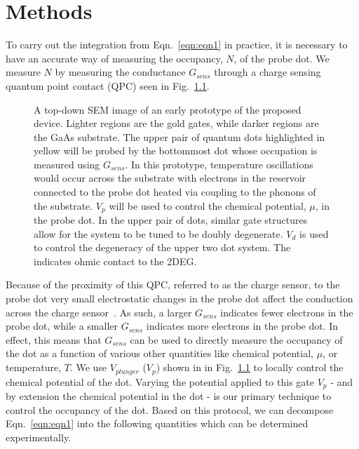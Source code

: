 
\chapter{Methods}
\label{ch:Methods}

To carry out the integration from Eqn.~\ref{eqn:eqn1} in practice, it is necessary to have an accurate way of measuring the occupancy, $N$, of the probe dot. We measure $N$ by measuring the conductance $G_{sens}$ through a charge sensing quantum point contact (QPC) seen in Fig.~\ref{fig:device}. 
\begin{figure}[h]
\centering
{}
\caption{ A top-down SEM image of an early prototype of the proposed device. Lighter regions are the gold gates, while darker regions are the GaAs substrate. The upper pair of quantum dots highlighted in yellow will be probed by the bottommost dot whose occupation is measured using $G_{sens}$. In this prototype, temperature oscillations would occur across the substrate with electrons in the reservoir connected to the probe dot heated via coupling to the phonons of the substrate. $V_p$ will be used to control the chemical potential, $\mu$, in the probe dot. In the upper pair of dots, similar gate structures allow for the system to be tuned to be doubly degenerate. $V_d$ is used to control the degeneracy of the upper two dot system. The indicates ohmic contact to the 2DEG.}

\label{fig:device}       %
\end{figure}
Because of the proximity of this QPC, referred to as the charge sensor, to the probe dot very small electrostatic changes in the probe dot affect the conduction across the charge sensor~\cite{spintocharge}. As such, a larger $G_{sens}$ indicates fewer electrons in the probe dot, while a smaller $G_{sens}$ indicates more electrons in the probe dot. In effect, this means that $G_{sens}$ can be used to directly measure the occupancy of the dot as a function of various other quantities like chemical potential, $\mu$, or temperature, $T$. We use $V_{plunger}$ ($V_p$) shown in in Fig.~\ref{fig:device} to locally control the chemical potential of the dot. Varying the potential applied to this gate $V_p$ - and by extension the chemical potential in the dot - is our primary technique to control the occupancy of the dot. Based on this protocol, we can decompose Eqn.~\ref{eqn:eqn1} into the following quantities which can be determined experimentally.
